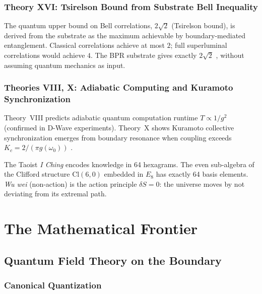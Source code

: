 \documentclass[12pt,oneside]{book}
\theoremstyle{definition}
\newcommand{\EEight}{E_8}
\begin{document}
\section{Theory XVI: Tsirelson Bound from Substrate Bell Inequality}

The quantum upper bound on Bell correlations, $2\sqrt{2}$ (Tsirelson bound),
is derived from the substrate as the maximum achievable by boundary-mediated
entanglement. Classical correlations achieve at most $2$; full superluminal
correlations would achieve $4$. The BPR substrate gives exactly $2\sqrt{2}$
\citep{Hensen2015}, without assuming quantum mechanics as input.

\section{Theories VIII, X: Adiabatic Computing and Kuramoto Synchronization}

Theory~VIII predicts adiabatic quantum computation runtime $T \propto 1/g^2$
(confirmed in D-Wave experiments). Theory~X shows Kuramoto collective synchronization
emerges from boundary resonance when coupling exceeds $K_c = 2/(\pi g(\omega_0))$
\citep{Kiss2007}.

\begin{resonance}
The Taoist \textit{I Ching} encodes knowledge in 64 hexagrams. The even
sub-algebra of the Clifford structure $\mathrm{Cl}(6,0)$ embedded in $\EEight$ has
exactly 64 basis elements. \textit{Wu wei} (non-action) is the action principle
$\delta S = 0$: the universe moves by not deviating from its extremal path.
\end{resonance}

\part{The Mathematical Frontier}

\chapter{Quantum Field Theory on the Boundary}
\label{chap:qft}

\section{Canonical Quantization}
\end{document}
